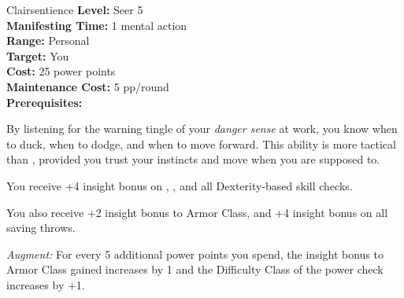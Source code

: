 {Clairsentience}
{
	\textbf{Level:}
	Seer 5\\
	\textbf{Manifesting Time:}
	1 mental action\\
	\textbf{Range:}
	Personal\\
	\textbf{Target:}
	You\\
	\textbf{Cost:}
	25 power points\\
	\textbf{Maintenance Cost:}
	5 pp/round\\
	\textbf{Prerequisites:}
	\\
}
{
	By listening for the warning tingle of your \emph{danger sense} at work, you know when to duck, when to dodge, and when to move forward. This ability is more tactical than , provided you trust your instincts and move when you are supposed to.

	You receive +4 insight bonus on , , and all Dexterity-based skill checks.

	You also receive +2 insight bonus to Armor Class, and +4 insight bonus on all saving throws.

	\textit{Augment:} For every 5 additional power points you spend, the insight bonus to Armor Class gained increases by 1 and the Difficulty Class of the power check increases by +1.
}